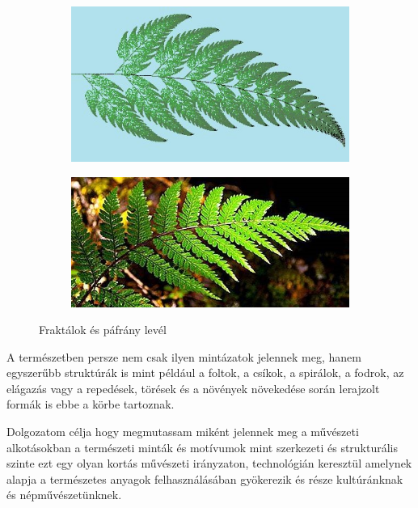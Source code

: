 \documentclass[fontsize=12pt, appendixprefix=true]{scrreprt}
\begin{document}
\begin{figure}[h!]
	\centering
	\begin{subfigure}[b]{0.4\linewidth}
	  \includegraphics[width=\linewidth]{img/fraktal_01.jpg}
	  \caption{}
	\end{subfigure}
	\begin{subfigure}[b]{0.47\linewidth}
	  \includegraphics[width=\linewidth]{img/fraktal_02.jpg}
	  \caption{}
	\end{subfigure}
	\caption{Fraktálok és páfrány levél}
	\label{fig:fraktal}
  \end{figure}

A természetben persze nem csak ilyen mintázatok jelennek meg, hanem egyszerűbb struktúrák is mint például a foltok, a csíkok, a spirálok, a fodrok, az elágazás vagy a repedések, törések és a növények növekedése során lerajzolt formák is ebbe a körbe tartoznak.

Dolgozatom célja hogy megmutassam miként jelennek meg a művészeti alkotásokban a természeti minták és motívumok mint szerkezeti és strukturális szinte ezt egy olyan kortás művészeti irányzaton, technológián keresztül amelynek alapja a természetes anyagok felhasználásában gyökerezik és része kultúránknak és népművészetünknek.
\end{document}
